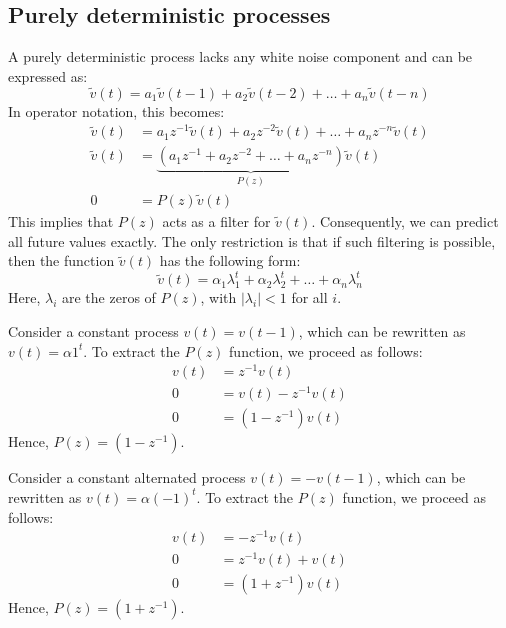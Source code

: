 \subsection{Purely deterministic processes}
A purely deterministic process lacks any white noise component and can be expressed as:
\[\tilde{v}(t)=a_1\tilde{v}(t-1)+a_2\tilde{v}(t-2)+\dots+a_n\tilde{v}(t-n)\]
In operator notation, this becomes:
\begin{align*}
    \tilde{v}(t)    &= a_1z^{-1}\tilde{v}(t)+a_2z^{-2}\tilde{v}(t)+\dots+a_nz^{-n}\tilde{v}(t) \\
    \tilde{v}(t)    &= \underbrace{\left(a_1z^{-1}+a_2z^{-2}+\dots+a_nz^{-n}\right)}_{P(z)} \tilde{v}(t) \\
    0               &= P(z)\tilde{v}(t)
\end{align*}
This implies that $P(z)$ acts as a filter for $\tilde{v}(t)$. 
Consequently, we can predict all future values exactly.
The only restriction is that if such filtering is possible, then the function $\tilde{v}(t)$ has the following form:
\[\tilde{v}(t)=\alpha_1\lambda_1^t+\alpha_2\lambda_2^t+\dots+\alpha_n\lambda_n^t\]
Here, $\lambda_i$ are the zeros of $P(z)$, with $\left\lvert \lambda_i\right\rvert < 1$ for all $i$.
\begin{example}
    Consider a constant process $v(t)=v(t-1)$, which can be rewritten as $v(t)=\alpha 1^t$. 
    To extract the $P(z)$ function, we proceed as follows:
    \begin{align*}
        v(t)    &=z^{-1}v(t) \\
        0       &=v(t) - z^{-1}v(t) \\
        0       &=\left(1-z^{-1}\right)v(t)
    \end{align*}
    Hence, $P(z)=\left(1-z^{-1}\right)$. 
\end{example}
\begin{example}
    Consider a constant alternated process $v(t)=-v(t-1)$, which can be rewritten as $v(t)=\alpha (-1)^t$. 
    To extract the $P(z)$ function, we proceed as follows:
    \begin{align*}
        v(t)    &=-z^{-1}v(t) \\
        0       &=z^{-1}v(t) + v(t) \\
        0       &=\left(1+z^{-1}\right)v(t)
    \end{align*}
    Hence, $P(z)=\left(1+z^{-1}\right)$. 
\end{example}
